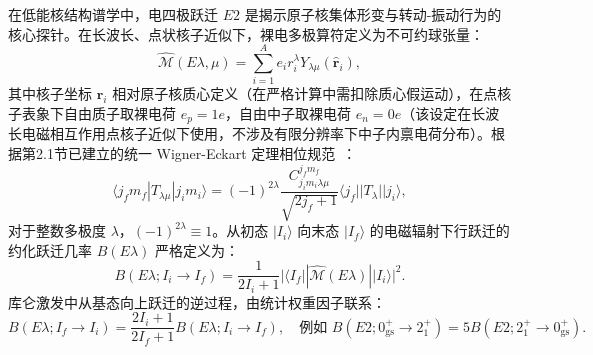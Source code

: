 在低能核结构谱学中，电四极跃迁 $E2$ 是揭示原子核集体形变与转动-振动行为的核心探针。在长波长、点状核子近似下，裸电多极算符定义为不可约球张量：
\begin{equation}\label{eq:2-7-bare-E-op}
\hat{\mathcal{M}}(E\lambda, \mu) = \sum_{i=1}^A e_i r_i^\lambda Y_{\lambda\mu}(\hat{\mathbf{r}}_i),
\end{equation}
其中核子坐标 $\mathbf{r}_i$ 相对原子核质心定义（在严格计算中需扣除质心假运动），在点核子表象下自由质子取裸电荷 $e_p = 1e$，自由中子取裸电荷 $e_n = 0e$（该设定在长波长电磁相互作用点核子近似下使用，不涉及有限分辨率下中子内禀电荷分布）。根据第2.1节已建立的统一 Wigner-Eckart 定理相位规范~\cite{book-suhonen-from-nucleons-to-nucleus}：
\begin{equation}\label{eq:2-7-wigner-eckart-phase}
\langle j_f m_f | T_{\lambda\mu} | j_i m_i \rangle = (-1)^{2\lambda} \frac{C_{j_i m_i \lambda\mu}^{j_f m_f}}{\sqrt{2j_f + 1}} \langle j_f || T_\lambda || j_i \rangle,
\end{equation}
对于整数多极度 $\lambda$，$(-1)^{2\lambda} \equiv 1$。从初态 $|I_i\rangle$ 向末态 $|I_f\rangle$ 的电磁辐射下行跃迁的约化跃迁几率 $B(E\lambda)$ 严格定义为：
\begin{equation}\label{eq:2-7-BE2-def}
B(E\lambda; I_i \to I_f) = \frac{1}{2I_i + 1} |\langle I_f || \hat{\mathcal{M}}(E\lambda) || I_i \rangle|^2.
\end{equation}
库仑激发中从基态向上跃迁的逆过程，由统计权重因子联系：
\begin{equation}\label{eq:2-7-up-down-relation}
B(E\lambda; I_f \to I_i) = \frac{2I_i + 1}{2I_f + 1} B(E\lambda; I_i \to I_f), \quad \text{例如 } B(E2; 0^+_{\mathrm{gs}} \to 2^+_1) = 5 B(E2; 2^+_1 \to 0^+_{\mathrm{gs}}).
\end{equation}

